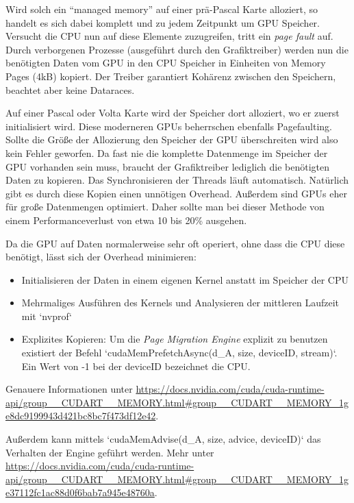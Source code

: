 		\bigskip
		
		Wird solch ein \enquote{managed memory} auf einer prä-Pascal Karte alloziert, so handelt es sich dabei komplett und zu jedem Zeitpunkt um GPU Speicher. Versucht die CPU nun auf diese Elemente zuzugreifen, tritt ein \textit{page fault} auf. Durch verborgenen Prozesse (ausgeführt durch den Grafiktreiber) werden nun die benötigten Daten vom GPU in den CPU Speicher in Einheiten von Memory Pages (4kB) kopiert. Der Treiber garantiert Kohärenz zwischen den Speichern, beachtet aber keine Dataraces.
		
		Auf einer Pascal oder Volta Karte wird der Speicher dort alloziert, wo er zuerst initialisiert wird. Diese moderneren GPUs beherrschen ebenfalls Pagefaulting. Sollte die Größe der Allozierung den Speicher der GPU überschreiten wird also kein Fehler geworfen. Da fast nie die komplette Datenmenge im Speicher der GPU vorhanden sein muss, braucht der Grafiktreiber lediglich die benötigten Daten zu kopieren. Das Synchronisieren der \Glspl{Thread} läuft automatisch. Natürlich gibt es durch diese Kopien einen unnötigen Overhead. Außerdem sind GPUs eher für große Datenmengen optimiert. Daher sollte man bei dieser Methode von einem Performanceverlust von etwa 10 bis 20\% ausgehen. 
		
		Da die GPU auf Daten normalerweise sehr oft operiert, ohne dass die CPU diese benötigt, lässt sich der Overhead minimieren:
		\begin{itemize}
		\item Initialisieren der Daten in einem eigenen \Gls{Kernel} anstatt im Speicher der CPU
		\item Mehrmaliges Ausführen des \Gls{Kernel}s und Analysieren der mittleren Laufzeit mit \li`nvprof`
		\item Explizites Kopieren: Um die \textit{Page Migration Engine} explizit zu benutzen existiert der Befehl \li`cudaMemPrefetchAsync(d_A, size, deviceID, stream)`. Ein Wert von -1 bei der deviceID bezeichnet die CPU.
		\end{itemize}
		Genauere Informationen unter \url{https://docs.nvidia.com/cuda/cuda-runtime-api/group__CUDART__MEMORY.html#group__CUDART__MEMORY_1ge8dc9199943d421bc8bc7f473df12e42}.
		
		Außerdem kann mittels \li`cudaMemAdvise(d_A, size, advice, deviceID)` das Verhalten der Engine geführt werden. Mehr unter \url{https://docs.nvidia.com/cuda/cuda-runtime-api/group__CUDART__MEMORY.html#group__CUDART__MEMORY_1ge37112fc1ac88d0f6bab7a945e48760a}.

